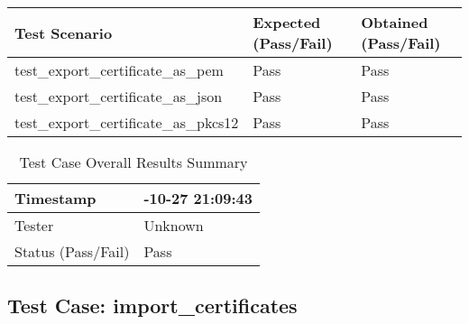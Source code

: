 \documentclass[a4paper,12pt]{article}
\begin{document}
\begin{table}[h]
    \centering
    \begin{tabularx}{1\textwidth}{ 
      | >{\raggedright\arraybackslash}X   
      | p{2.5cm}                            
      | p{2.5cm} |}                         
        \hline
        \textbf{Test Scenario} & \textbf{Expected (Pass/Fail)} & \textbf{Obtained (Pass/Fail)} \\  
        \hline

test\_export\_certificate\_as\_pem & Pass & Pass \\
\hline

test\_export\_certificate\_as\_json & Pass & Pass \\
\hline

test\_export\_certificate\_as\_pkcs12 & Pass & Pass \\
\hline

    \end{tabularx}
\end{table}

    \begin{table}[h]
        \centering
        \begin{tabularx}{1\textwidth}{ 
          | >{\raggedright\arraybackslash}X 
          | >{\raggedright\arraybackslash}X | }
            \hline
            Timestamp & 2024-10-27 21:09:43 \\
            \hline
            Tester & Unknown \\
            \hline
            \rowcolor{green!30} %
            Status (Pass/Fail) & Pass \\
            \hline
        \end{tabularx}
        \caption{Test Case Overall Results Summary}
        \label{tab:test_case_info}
    \end{table}

    \newpage
    
\subsection{Test Case: import\_certificates}
\end{document}
